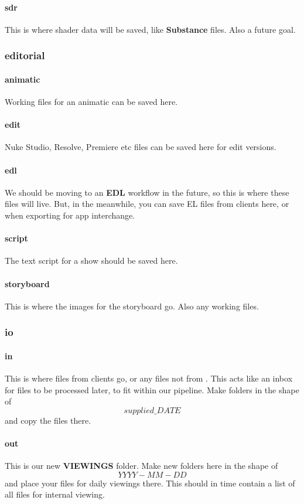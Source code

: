 \paragraph{sdr}
This is where shader data will be saved, like \textbf{Substance} files. Also a future goal. 

\subsubsection{editorial}
\paragraph{animatic}
Working files for an animatic can be saved here.
\paragraph{edit}
Nuke Studio, Resolve, Premiere etc files can be saved here for edit versions. 
\paragraph{edl}
We should be moving to an \textbf{EDL} workflow in the future, so this is where these files will live. But, in the meanwhile, you can save EL files from clients here, or when exporting for app interchange. 
\paragraph{script}
The text script for a show should be saved here. 
\paragraph{storyboard}
This is where the images for the storyboard go. Also any working files.

\subsubsection{io}
\paragraph{in}
This is where files from clients go, or any files not from \luma{}. This acts like an inbox for files to be processed later, to fit within our pipeline. Make folders in the shape of \texttt{\[supplied\_DATE\]} and copy the files there.
\paragraph{out}
This is our new \textbf{VIEWINGS} folder. Make new folders here in the shape of \texttt{\[YYYY-MM-DD\]} and place your files for daily viewings there. This should in time contain a list of all files for internal viewing.
